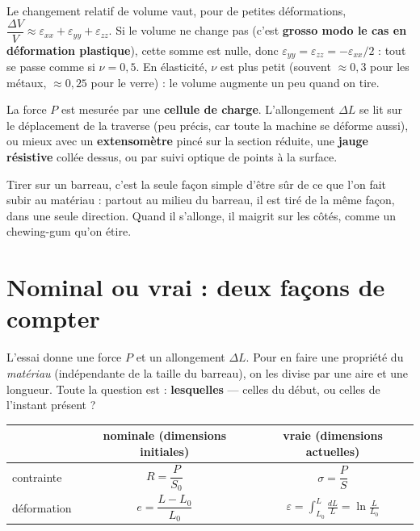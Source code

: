 \begin{propbox}[title={À volume constant, $\nu = 1/2$}]
Le changement relatif de volume vaut, pour de petites déformations,
$\dfrac{\Delta V}{V} \approx \varepsilon_{xx} + \varepsilon_{yy} + \varepsilon_{zz}$.
Si le volume ne change pas (c'est \textbf{grosso modo le cas en déformation plastique}),
cette somme est nulle, donc $\varepsilon_{yy} = \varepsilon_{zz} = -\varepsilon_{xx}/2$ :
tout se passe comme si $\nu = 0{,}5$. En élasticité, $\nu$ est plus petit (souvent
$\approx 0{,}3$ pour les métaux, $\approx 0{,}25$ pour le verre) : le volume augmente un peu
quand on tire.
\end{propbox}

\begin{rembox}[title=En pratique]
La force $P$ est mesurée par une \textbf{cellule de charge}. L'allongement $\Delta L$ se lit
sur le déplacement de la traverse (peu précis, car toute la machine se déforme aussi), ou mieux
avec un \textbf{extensomètre} pincé sur la section réduite, une \textbf{jauge résistive} collée
dessus, ou par suivi optique de points à la surface.
\end{rembox}

\begin{goatbox}
Tirer sur un barreau, c'est la seule façon simple d'être sûr de ce que l'on fait subir au
matériau : partout au milieu du barreau, il est tiré de la même façon, dans une seule
direction. Quand il s'allonge, il maigrit sur les côtés, comme un chewing-gum qu'on étire.
\end{goatbox}

\section{Nominal ou vrai : deux façons de compter}

L'essai donne une force $P$ et un allongement $\Delta L$. Pour en faire une propriété du
\emph{matériau} (indépendante de la taille du barreau), on les divise par une aire et une
longueur. Toute la question est : \textbf{lesquelles} --- celles du début, ou celles de
l'instant présent ?

\begin{defnbox}[title={Grandeurs nominales (\emph{engineering}) et vraies (\emph{true})}]
\begin{center}
\renewcommand{\arraystretch}{1.6}
\begin{tabular}{l|c|c}
 & nominale (dimensions initiales) & vraie (dimensions actuelles) \\ \hline
contrainte & $R = \dfrac{P}{S_0}$ & $\sigma = \dfrac{P}{S}$ \\
déformation & $e = \dfrac{L - L_0}{L_0}$ & $\varepsilon = \displaystyle\int_{L_0}^{L}\frac{dL}{L} = \ln\frac{L}{L_0}$ \\
\end{tabular}
\end{center}
\end{defnbox}

